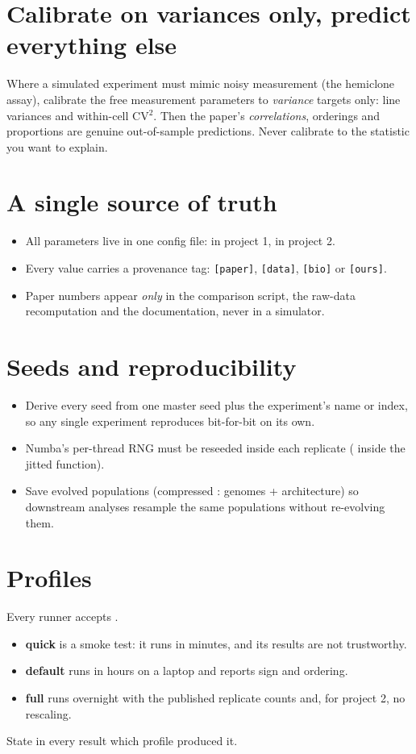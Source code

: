 \section{Calibrate on variances only, predict everything else}
Where a simulated experiment must mimic noisy measurement (the hemiclone assay), calibrate the free measurement parameters to \emph{variance} targets only: line variances and within-cell CV$^2$. Then the paper's \emph{correlations}, orderings and proportions are genuine out-of-sample predictions. Never calibrate to the statistic you want to explain.

\section{A single source of truth}
\begin{itemize}
\item All parameters live in one config file:  in project 1,  in project 2.
\item Every value carries a provenance tag: \texttt{[paper]}, \texttt{[data]}, \texttt{[bio]} or \texttt{[ours]}.
\item Paper numbers appear \emph{only} in the comparison script, the raw-data recomputation and the documentation, never in a simulator.
\end{itemize}

\section{Seeds and reproducibility}
\begin{itemize}
\item Derive every seed from one master seed plus the experiment's name or index, so any single experiment reproduces bit-for-bit on its own.
\item Numba's per-thread RNG must be reseeded inside each replicate ( inside the jitted function).
\item Save evolved populations (compressed : genomes + architecture) so downstream analyses resample the same populations without re-evolving them.
\end{itemize}

\section{Profiles}
Every runner accepts .
\begin{itemize}
\item \textbf{quick} is a smoke test: it runs in minutes, and its results are not trustworthy.
\item \textbf{default} runs in hours on a laptop and reports sign and ordering.
\item \textbf{full} runs overnight with the published replicate counts and, for project 2, no rescaling.
\end{itemize}
State in every result which profile produced it.

